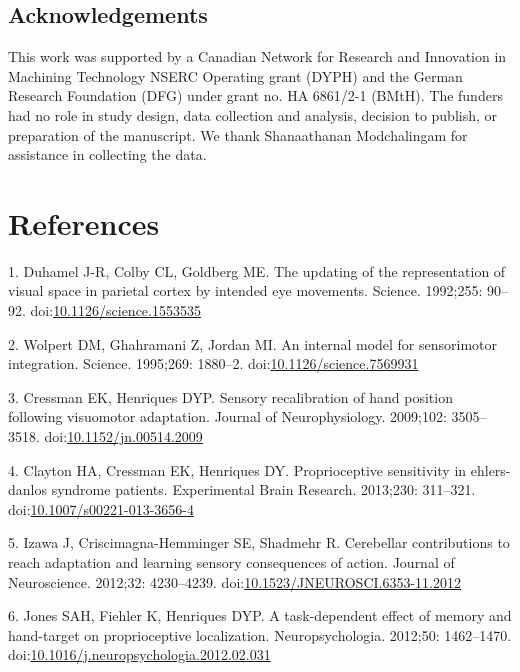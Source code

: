 \documentclass[10pt,letterpaper]{article}
\begin{document}
\subsection{Acknowledgements}\label{acknowledgements}

This work was supported by a Canadian Network for Research and
Innovation in Machining Technology NSERC Operating grant (DYPH) and the
German Research Foundation (DFG) under grant no. HA 6861/2-1 (BMtH). The
funders had no role in study design, data collection and analysis,
decision to publish, or preparation of the manuscript. We thank
Shanaathanan Modchalingam for assistance in collecting the data.

\section*{References}\label{references}

\hypertarget{refs}{}
\hypertarget{ref-Duhamel1992a}{}
1. Duhamel J-R, Colby CL, Goldberg ME. The updating of the
representation of visual space in parietal cortex by intended eye
movements. Science. 1992;255: 90--92.
doi:\href{https://doi.org/10.1126/science.1553535}{10.1126/science.1553535}

\hypertarget{ref-Wolpert1995}{}
2. Wolpert DM, Ghahramani Z, Jordan MI. An internal model for
sensorimotor integration. Science. 1995;269: 1880--2.
doi:\href{https://doi.org/10.1126/science.7569931}{10.1126/science.7569931}

\hypertarget{ref-Cressman2009}{}
3. Cressman EK, Henriques DYP. Sensory recalibration of hand position
following visuomotor adaptation. Journal of Neurophysiology. 2009;102:
3505--3518.
doi:\href{https://doi.org/10.1152/jn.00514.2009}{10.1152/jn.00514.2009}

\hypertarget{ref-Clayton2013}{}
4. Clayton HA, Cressman EK, Henriques DY. Proprioceptive sensitivity in
ehlers-danlos syndrome patients. Experimental Brain Research. 2013;230:
311--321.
doi:\href{https://doi.org/10.1007/s00221-013-3656-4}{10.1007/s00221-013-3656-4}

\hypertarget{ref-Izawa2012b}{}
5. Izawa J, Criscimagna-Hemminger SE, Shadmehr R. Cerebellar
contributions to reach adaptation and learning sensory consequences of
action. Journal of Neuroscience. 2012;32: 4230--4239.
doi:\href{https://doi.org/10.1523/JNEUROSCI.6353-11.2012}{10.1523/JNEUROSCI.6353-11.2012}

\hypertarget{ref-Jones2012a}{}
6. Jones SAH, Fiehler K, Henriques DYP. A task-dependent effect of
memory and hand-target on proprioceptive localization. Neuropsychologia.
2012;50: 1462--1470.
doi:\href{https://doi.org/10.1016/j.neuropsychologia.2012.02.031}{10.1016/j.neuropsychologia.2012.02.031}
\end{document}
